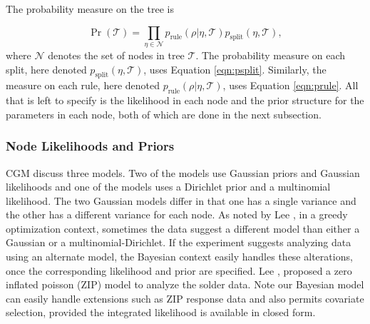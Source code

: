  The probability measure on the tree is  
 
 \begin{equation}
 \Pr(\mathcal{T}) = \prod_{\eta \in \mathcal{N}} p_{\text{rule}}(\rho \vert \eta, \mathcal{T})p_{\text{split}}(\eta, \mathcal{T}),
\end{equation}
where $\mathcal{N}$ denotes the set of nodes in tree $\mathcal{T}$.
The probability measure on each split, here denoted $p_{\text{split}}(\eta, \mathcal{T})$, uses Equation \ref{eqn:psplit}. Similarly, the measure on each rule, here denoted $p_{\text{rule}}(\rho \vert \eta, \mathcal{T})$, uses Equation \ref{eqn:prule}. 
All that is left to specify is the likelihood in each node and the prior structure for the parameters in each node, both of which are done in the next subsection. 

\subsubsection{Node Likelihoods and Priors}

CGM discuss three models. Two of the models use Gaussian priors and Gaussian likelihoods and one of the models uses a Dirichlet prior and a multinomial likelihood. The two Gaussian models differ in that one has a single variance and the other has a different variance for each node. As noted by Lee \cite{lee2006decision}, in a greedy optimization context, sometimes the data suggest a different model than either a Gaussian or a multinomial-Dirichlet. If the experiment suggests analyzing data using an alternate model, the Bayesian context easily handles these alterations, once the corresponding likelihood and prior are specified. Lee \cite{lee2006decision}, proposed a zero inflated poisson (ZIP) model to analyze the solder data. Note our Bayesian model can easily handle extensions such as ZIP response data and also permits covariate selection, provided the integrated likelihood is available in closed form.

